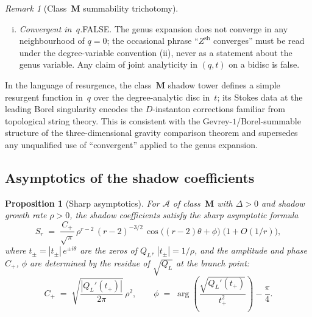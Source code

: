 \documentclass[11pt,reqno]{amsart}
\newtheorem{proposition}[theorem]{Proposition}
\theoremstyle{definition}
\theoremstyle{remark}
\newtheorem{remark}[theorem]{Remark}
\newcommand{\cA}{\mathcal{A}}
\numberwithin{equation}{section}
\begin{document}
\begin{remark}[Class~$\mathbf{M}$ summability
trichotomy]
\begin{enumerate}[(i)]
 singularities produces a sectorial resummation
 $Z^{\mathrm{sh}}_\theta(\cA;q,t)$, analytic in a Stokes
 sector in~$q$.
\item \emph{Convergent in~$q$.}\enspace FALSE. The
 genus expansion does not converge in any neighbourhood
 of $q=0$; the occasional phrase ``$Z^{\mathrm{sh}}$
 converges'' must be read
 under the degree-variable convention (ii), never as a
 statement about the genus variable. Any claim of joint
 analyticity in $(q,t)$ on a bidisc is false.
\end{enumerate}
In the language of resurgence, the class~$\mathbf{M}$
shadow tower defines a simple resurgent function in~$q$
over the degree-analytic disc in~$t$; its Stokes data at
the leading Borel singularity encodes the
$D$-instanton corrections familiar from topological
string theory. This is consistent with the
Gevrey-$1$/Borel-summable structure of the three-dimensional gravity
comparison theorem and supersedes any
unqualified use of ``convergent'' applied to the genus
expansion.
\end{remark}


\subsection{Asymptotics of the shadow
coefficients}\label{subsec:asymptotics}

\begin{proposition}[Sharp
asymptotics]\label{prop:sharp-asymptotics}
For $\cA$ of class~$\mathbf{M}$ with $\Delta > 0$ and
shadow growth rate $\rho > 0$, the shadow coefficients
satisfy the sharp asymptotic formula
\begin{equation}\label{eq:sharp-asymptotics}
 S_r
 \;=\;
 \frac{C_+}{\sqrt{\pi}}\,
 \rho^{r-2}\, (r-2)^{-3/2}\,
 \cos\bigl((r-2)\theta + \phi\bigr)
 \;\bigl(1 + O(1/r)\bigr),
\end{equation}
where $t_\pm = |t_\pm|\, e^{\pm i\theta}$ are the zeros
of $Q_L$, $|t_\pm| = 1/\rho$, and the amplitude and phase
$C_+$, $\phi$ are determined by the residue of $\sqrt{Q_L}$
at the branch point:
\[
 C_+
 \;=\;
 \sqrt{\frac{|Q_L'(t_+)|}{2\pi}}\, \rho^2,
 \qquad
 \phi \;=\; \arg\!\left(\frac{\sqrt{Q_L'(t_+)}}{t_+^2}\right)
 - \frac{\pi}{4}.
\]
\end{proposition}
\end{document}
